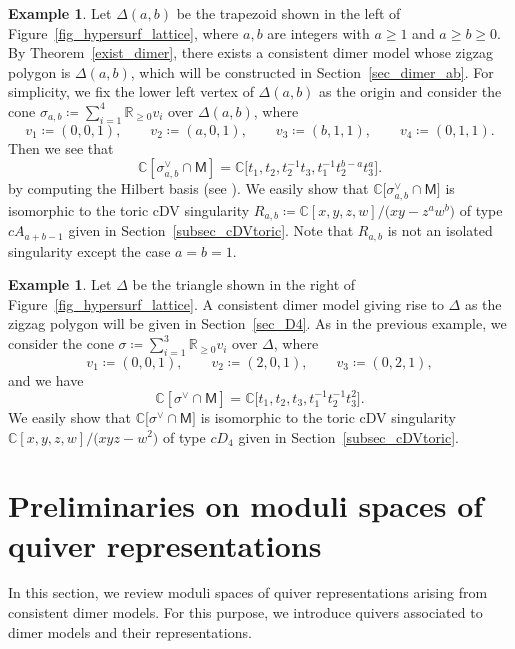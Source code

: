 \documentclass[10pt,a4paper]{amsart}
\numberwithin{equation}{section}
\theoremstyle{definition}
\newtheorem{Example}[Theorem]{Example}
\newcommand{\RR}{\mathbb{R}}
\newcommand{\CC}{\mathbb{C}}
\newcommand{\sfM}{\mathsf{M}}
\begin{document}
\begin{Example}
\label{ex_toric1}
Let $\Delta(a,b)$ be the trapezoid shown in the left of Figure~\ref{fig_hypersurf_lattice}, where $a, b$ are integers with $a\ge 1$ and $a\ge b\ge0$.
By Theorem~\ref{exist_dimer}, there exists a consistent dimer model whose zigzag polygon is $\Delta(a,b)$, which will be constructed in Section~\ref{sec_dimer_ab}.
For simplicity, we fix the lower left vertex of $\Delta(a,b)$ as the origin and consider the cone $\sigma_{a,b}\coloneqq \sum_{i=1}^4\RR_{\ge0} v_i$ over $\Delta(a,b)$, where
\[
v_1\coloneqq (0,0,1), \qquad v_2\coloneqq (a,0,1), \qquad v_3\coloneqq (b,1,1), \qquad v_4\coloneqq (0,1,1).
\]
Then we see that
\[
\CC[\sigma_{a,b}^\vee\cap\sfM]=\CC\bigr[t_1, t_2, t_2^{-1}t_3, t_1^{-1}t_2^{b-a}t_3^a\bigl].
\]
by computing the Hilbert basis (see \cite[Proposition~1.2.23]{CLS}).
We easily show that $\CC\bigl[\sigma_{a,b}^\vee\cap\sfM\bigr]$ is isomorphic to the toric cDV singularity
$R_{a,b}\coloneqq \CC[x,y,z,w]/\bigl(xy-z^aw^b\bigr)$ of type $cA_{a+b-1}$ given in Section~\ref{subsec_cDVtoric}.
Note that $R_{a,b}$ is not an isolated singularity except the case $a=b=1$.
\end{Example}

\begin{Example}\label{ex_toric2}
Let $\Delta$ be the triangle shown in the right of Figure~\ref{fig_hypersurf_lattice}.
A consistent dimer model giving rise to $\Delta$ as the zigzag polygon will be given in Section~\ref{sec_D4}.
As in the previous example, we consider the cone $\sigma\coloneqq \sum_{i=1}^3\RR_{\ge0} v_i$ over $\Delta$, where
\[
v_1\coloneqq (0,0,1), \qquad v_2\coloneqq (2,0,1), \qquad v_3\coloneqq (0,2,1),
\]
and we have
\[
\CC[\sigma^\vee\cap\sfM]=\CC\bigl[t_1, t_2, t_3, t_1^{-1}t_2^{-1}t_3^2\bigr].
\]
We easily show that $\CC\bigl[\sigma^\vee\cap\sfM\bigr]$ is isomorphic to the toric cDV singularity
$\CC[x,y,z,w]/\bigl(xyz-w^2\bigr)$ of type $cD_4$ given in Section~\ref{subsec_cDVtoric}.
\end{Example}

\section{Preliminaries on moduli spaces of quiver representations}\label{sec_quiver_rep}

In this section, we review moduli spaces of quiver representations arising from consistent dimer models.
For this purpose, we introduce quivers associated to dimer models and their representations.
\end{document}
